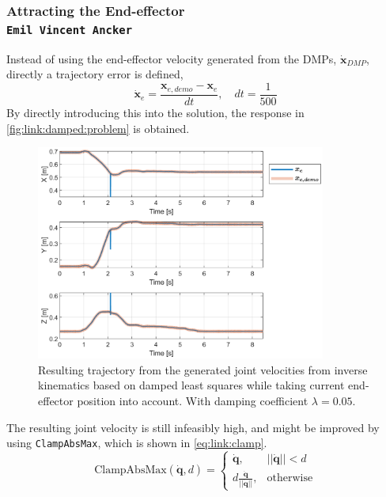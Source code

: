\documentclass[../main.tex]{subfiles}
\begin{document}
\subsubsection{Attracting the End-effector   \\ \normalfont\normalsize\texttt{Emil Vincent Ancker}}
Instead of using the end-effector velocity generated from the DMPs, $\dot{\boldsymbol{x}}_{DMP}$, directly a trajectory error is defined,
\begin{equation}
    \dot{\boldsymbol{x}}_{e} = \frac{\boldsymbol{x}_{e,demo} - \boldsymbol{x}_e}{dt}, \quad dt = \frac{1}{500}
\end{equation}
By directly introducing this into the solution, the response in \autoref{fig:link:damped:problem} is obtained.
\begin{figure}[H]
    \centering
         \includegraphics[width=0.85\textwidth]{figures/linkcollision/inversekin_damped_ok.png}
     \caption{Resulting trajectory from the generated joint velocities from inverse kinematics based on damped least squares while taking current end-effector position into account. With damping coefficient $\lambda = 0.05$.}
     \label{fig:link:damped:ok}
\end{figure}
The resulting joint velocity is still infeasibly high, and might be improved by using \texttt{ClampAbsMax}, which is shown in \autoref{eq:link:clamp}.
\begin{equation} \label{eq:link:clamp}
    \text{ClampAbsMax}(\dot{\boldsymbol{q}} , d) =  \begin{cases}
      \dot{\boldsymbol{q}}, & ||\dot{\boldsymbol{q}}|| < d \\
      d \frac{\dot{\boldsymbol{q}}}{||\dot{\boldsymbol{q}}||}, & \text{otherwise}
    \end{cases}
\end{equation}
\end{document}
